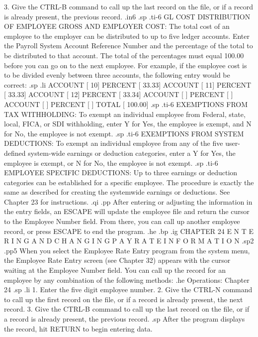 		3. Give the CTRL-B command to call up the
		   last record on the file, or if a record
		   is already present, the previous record.
.in6
.sp
.ti-6
GL COST DISTRIBUTION OF EMPLOYEE GROSS AND EMPLOYER COST: The total
cost of an employee to the employer can be distributed to up to five ledger
accounts.  Enter the Payroll System Account Reference Number and the percentage
of the total to be distributed to that account.  The total of the percentages
must equal 100.00 before you can go on to the next employee.  For example,
if the employee cost is to be divided evenly between three accounts,
the following entry would be correct:
.sp
.li
	     ACCOUNT [ 10]    PERCENT  [   33.33]
	     ACCOUNT [ 11]    PERCENT  [   33.33]
	     ACCOUNT [ 12]    PERCENT  [   33.34]
	     ACCOUNT [	 ]    PERCENT  [	]
	     ACCOUNT [	 ]    PERCENT  [	]
			      TOTAL    [  100.00]
.sp
.ti-6
EXEMPTIONS FROM TAX WITHHOLDING:  To exempt an individual employee
from Federal, state, local, FICA, or SDI withholding, enter Y for
Yes, the employee is exempt, and N for No, the employee is not exempt.
.sp
.ti-6
EXEMPTIONS FROM SYSTEM DEDUCTIONS: To exempt an individual employee from
any of the five user-defined system-wide earnings or deduction
categories, enter
a Y for Yes, the employee is exempt, or N for No, the employee is not
exempt.
.sp
.ti-6
EMPLOYEE SPECIFIC DEDUCTIONS: Up to three earnings
or deduction categories can be established for a specific employee.
The procedure is exactly the same as described for creating the systemwide
earnings or deductions.  See Chapter 23 for
instructions.
.qi
.pp
After entering or adjusting the information in the entry fields,
an ESCAPE will update the employee file and return the cursor to
the Employee Number field.  From there, you can call up another employee
record, or press ESCAPE to end the program.
.he
.bp
.ig
CHAPTER 24
E N T E R I N G    A N D    C H A N G I N G
P A Y	R A T E    I N F O R M A T I O N
.sp2
.pp5
When you select the Employee Rate Entry program from the system menu,
the Employee Rate Entry screen (see Chapter 32) appears with the cursor
waiting at the Employee Number field.  You can call up the record for an
employee by any combination of the following methods:
.he Operations: Chapter 24
.sp
.li
	   1. Enter the five digit employee number.
	   2. Give the CTRL-N command to call up the
	      first record on the file, or if a record
	      is already present, the next record.
	   3. Give the CTRL-B command to call up the
	      last record on the file, or if a record
	      is already present, the previous record.
.sp
After the program displays the record, hit RETURN to begin entering data.
